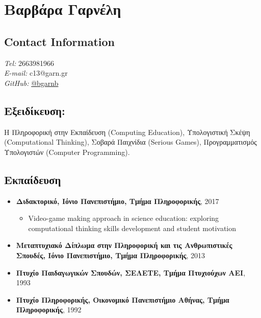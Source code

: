 \documentclass[%
    11pt,
  oneside
  ]{memoir}
\let\oldsection\section
\renewcommand{\section}[1]{%
  \oldsection{#1}
  \leavevmode
  \par
  \vspace{\dimexpr-\baselineskip-\parskip}
}
\begin{document}
      \chapter*{Βαρβάρα Γαρνέλη}
  

  \hypertarget{contact-information}{%
  \section{Contact Information}\label{contact-information}}
    \begin{minipage}[t]{0.3\textwidth}
      
    \end{minipage}
    \begin{minipage}[t]{0.7\textwidth}
                {\textit{Tel:}} 2663981966 \\
                        {\textit{E-mail:}} c13@garn.gr \\
                                        {\textit{GitHub:}} \href{http://github.com/bgarnb}{@bgarnb}
            \end{minipage}
  \hypertarget{ux3b5ux3beux3b5ux3b9ux3b4ux3afux3baux3b5ux3c5ux3c3ux3b7}{%
\section{Εξειδίκευση:}\label{ux3b5ux3beux3b5ux3b9ux3b4ux3afux3baux3b5ux3c5ux3c3ux3b7}}

Η Πληροφορική στην Εκπαίδευση (Computing Education), Υπολογιστική Σκέψη
(Computational Thinking), Σοβαρά Παιχνίδια (Serious Games),
Προγραμματισμός Υπολογιστών (Computer Programming).

\hypertarget{ux3b5ux3baux3c0ux3b1ux3afux3b4ux3b5ux3c5ux3c3ux3b7}{%
\section{Εκπαίδευση}\label{ux3b5ux3baux3c0ux3b1ux3afux3b4ux3b5ux3c5ux3c3ux3b7}}

\begin{itemize}
\tightlist
\item
  \textbf{Διδακτορικό, Ιόνιο Πανεπιστήμιο, Τμήμα Πληροφορικής}, 2017

  \begin{itemize}
  \tightlist
  \item
    Video-game making approach in science education: exploring
    computational thinking skills development and student motivation
  \end{itemize}
\item
  \textbf{Μεταπτυχιακό Δίπλωμα στην Πληροφορική και τις Ανθρωπιστικές
  Σπουδές, Ιόνιο Πανεπιστήμιο, Τμήμα Πληροφορικής}, 2013
\item
  \textbf{Πτυχίο Παιδαγωγικών Σπουδών, ΣΕΛΕΤΕ, Τμήμα Πτυχιούχων ΑΕΙ},
  1993
\item
  \textbf{Πτυχίο Πληροφορικής, Οικονομικό Πανεπιστήμιο Αθήνας, Τμήμα
  Πληροφορικής}, 1992
\end{itemize}
\end{document}

